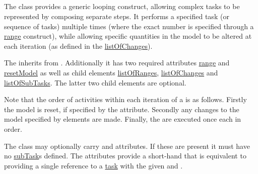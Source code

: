 \subsection{}
\label{class:repeatedTask}

The  class provides a generic looping construct, allowing complex tasks to be represented by composing separate steps.
It performs a specified task (or sequence of tasks) multiple times (where the exact number is specified through a \hyperref[sec:ranges]{range} construct), while allowing specific quantities in the model to be altered at each iteration (as defined in the \hyperref[sec:changes]{listOfChanges}).

The  inherits from .
Additionally it has two required attributes \hyperref[sec:rangeAttribute]{range} and \hyperref[sec:resetModel]{resetModel} as well as child elements \hyperref[sec:ranges]{listOfRanges}, \hyperref[sec:changes]{listOfChanges} and \hyperref[class:subTask]{listOfSubTasks}.
The latter two child elements are optional.

Note that the order of activities within each iteration of a  is as follows.
Firstly the model is reset, if specified by the  attribute.
Secondly any changes to the model specified by  elements are made.
Finally, the  are executed once each in order.

The  class may optionally carry  and  attributes.
If these are present it must have no \hyperref[class:subTask]{subTask}s defined.
The attributes provide a short-hand that is equivalent to providing a single  reference to a \hyperref[class:task]{task} with the given  and .

%
%


